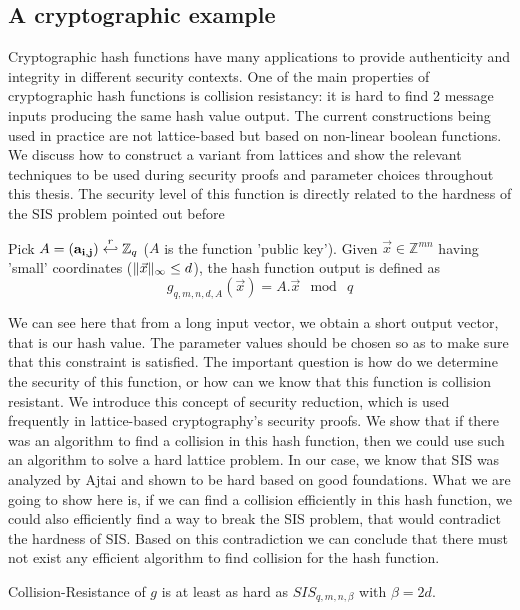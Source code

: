 \subsection{A cryptographic example}
\label{sec:ajtaiHash}
Cryptographic hash functions have many applications to
provide authenticity and integrity in different security contexts. One of the main properties of cryptographic
hash functions is collision resistancy: it is hard to find 2 message inputs
producing the same hash value output. The current constructions being used in practice
are not lattice-based but based on non-linear boolean functions. We discuss how
to construct a variant from lattices and show the relevant techniques
to be used during security proofs and parameter choices throughout this
thesis. The security level of this function is directly related to the hardness of
the SIS problem pointed out before
\begin{definition}
  Pick $A=(\mathbf{a_{i,j}}) \stackrel{r}{\hookleftarrow} \mathbb{Z}_q$ ($A$ is the function
  'public key'). Given $\vec{x} \in \mathbb{Z}^{mn}$ having 'small' coordinates
  ($\Vert \vec{x} \Vert_{\infty} \leq d$), the hash function output is defined as
  \[
    g_{q,m,n,d,A}(\vec{x}) = A . \vec{x} \mod \ q
  \]
  \label{def:Ajtai's Hash Function}
\end{definition}
We can see here that from a long input vector, we obtain a short output vector, that is
our hash value. The parameter values should be chosen so as to make sure that this constraint is
satisfied. The important question is how do we determine the security of this
function, or how can we know that this function is collision resistant. We
introduce this concept of security reduction, which is used frequently in
lattice-based cryptography's security proofs. We show that if there
was an algorithm to find a collision in this hash function, then we could use
such an algorithm to solve a hard lattice problem. In our case, we know that SIS
was analyzed by Ajtai and shown to be hard based on good foundations. What we
are going to show here is, if we can find a collision efficiently in this hash
function, we could also efficiently find a way to break the SIS problem, that
would contradict the hardness of SIS. Based on this contradiction we can
conclude that there must not exist any efficient algorithm to find collision for
the hash function.
\begin{theorem}
  Collision-Resistance of $g$ is at least as hard as $SIS_{q,m,n,\beta}$ with
  $\beta = 2d$.
  \label{the:ajtai hash}
\end{theorem}
